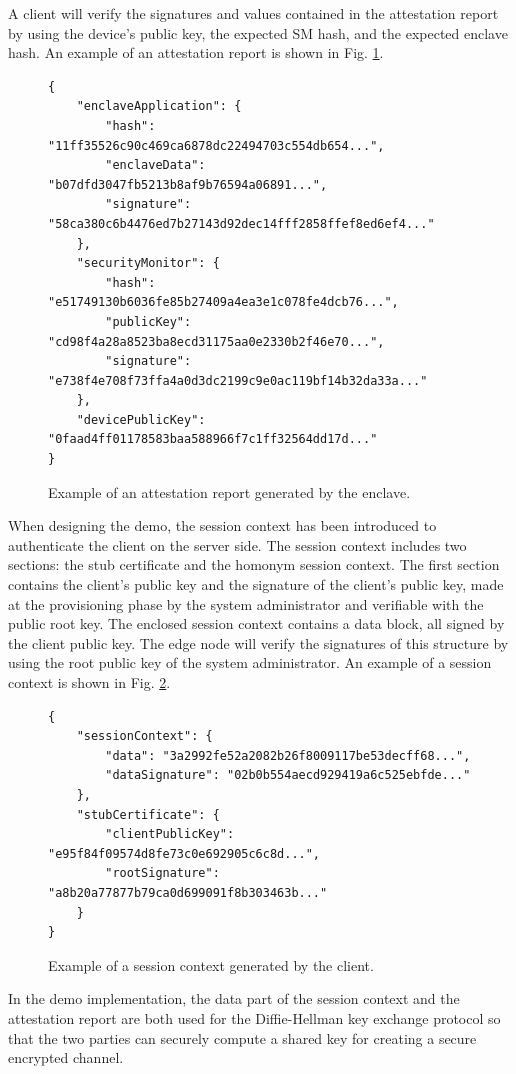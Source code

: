 A client will verify the signatures and values contained in the attestation report by using the device's public key, the expected SM hash, and the expected enclave hash. An example of an attestation report is shown in Fig. \ref{attestation-report}. \\
\begin{figure}[H]
\begin{lstlisting}[style=json, frame=single]
{
    "enclaveApplication": {
        "hash": "11ff35526c90c469ca6878dc22494703c554db654...",
        "enclaveData": "b07dfd3047fb5213b8af9b76594a06891...",
        "signature": "58ca380c6b4476ed7b27143d92dec14fff2858ffef8ed6ef4..."
    },
    "securityMonitor": {
        "hash": "e51749130b6036fe85b27409a4ea3e1c078fe4dcb76...",
        "publicKey": "cd98f4a28a8523ba8ecd31175aa0e2330b2f46e70...",
        "signature": "e738f4e708f73ffa4a0d3dc2199c9e0ac119bf14b32da33a..."
    },
    "devicePublicKey": "0faad4ff01178583baa588966f7c1ff32564dd17d..."
}
\end{lstlisting}
\caption{Example of an attestation report generated by the enclave. \label{attestation-report}}
\end{figure}
When designing the demo, the session context has been introduced to authenticate the client on the server side. The session context includes two sections: the stub certificate and the homonym session context. The first section contains the client's public key and the signature of the client's public key, made at the provisioning phase by the system administrator and verifiable with the public root key. The enclosed session context contains a data block, all signed by the client public key. 
The edge node will verify the signatures of this structure by using the root public key of the system administrator. An example of a session context is shown in Fig. \ref{session-context}. \\
\begin{figure}[H]
\begin{lstlisting}[captionpos=b,style=json, frame=single]
{
    "sessionContext": {
        "data": "3a2992fe52a2082b26f8009117be53decff68...",
        "dataSignature": "02b0b554aecd929419a6c525ebfde..."
    },
    "stubCertificate": {
        "clientPublicKey": "e95f84f09574d8fe73c0e692905c6c8d...",
        "rootSignature": "a8b20a77877b79ca0d699091f8b303463b..."
    }
}
\end{lstlisting}
\caption{Example of a session context generated by the client. \label{session-context}}
\end{figure}
In the demo implementation, the data part of the session context and the attestation report are both used for the Diffie-Hellman key exchange protocol so that the two parties can securely compute a shared key for creating a secure encrypted channel. 

